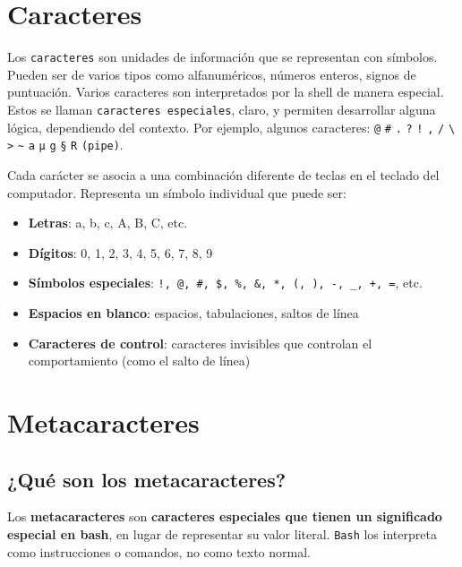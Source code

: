 \documentclass[
  spanish,
  12pt,
  letterpaper,
  DIV=11,
  numbers=noendperiod]{scrreprt}
\providecommand{\tightlist}{%
  \setlength{\itemsep}{0pt}\setlength{\parskip}{0pt}}
\begin{document}
\section{\texorpdfstring{\textbf{Caracteres}}{Caracteres}}\label{caracteres}

Los \texttt{caracteres} son unidades de información que se representan
con símbolos. Pueden ser de varios tipos como alfanuméricos, números
enteros, signos de puntuación. Varios caracteres son interpretados por
la shell de manera especial. Estos se llaman
\texttt{caracteres\ especiales}, claro, y permiten desarrollar alguna
lógica, dependiendo del contexto. Por ejemplo, algunos caracteres:
\texttt{@} \texttt{\#} \texttt{.} \texttt{?} \texttt{!} \texttt{,}
\texttt{/} \texttt{\textbackslash{}} \texttt{\textgreater{}}
\texttt{\textasciitilde{}} \texttt{a} \texttt{µ} \texttt{g} \texttt{§}
\texttt{R} \texttt{\textbar{}(pipe)}.

Cada carácter se asocia a una combinación diferente de teclas en el
teclado del computador. Representa un símbolo individual que puede ser:

\begin{itemize}
\tightlist
\item
  \textbf{Letras}: a, b, c, A, B, C, etc.
\item
  \textbf{Dígitos}: 0, 1, 2, 3, 4, 5, 6, 7, 8, 9
\item
  \textbf{Símbolos especiales}:
  \texttt{!,\ @,\ \#,\ \$,\ \%,\ \&,\ *,\ (,\ ),\ -,\ \_,\ +,\ =}, etc.
\item
  \textbf{Espacios en blanco}: espacios, tabulaciones, saltos de línea
\item
  \textbf{Caracteres de control}: caracteres invisibles que controlan el
  comportamiento (como el salto de línea)
\end{itemize}

\section{Metacaracteres}\label{metacaracteres}

\subsection{¿Qué son los
metacaracteres?}\label{quuxe9-son-los-metacaracteres}

Los \textbf{metacaracteres} son \textbf{caracteres especiales que tienen
un significado especial en bash}, en lugar de representar su valor
literal. \texttt{Bash} los interpreta como instrucciones o comandos, no
como texto normal.
\end{document}

